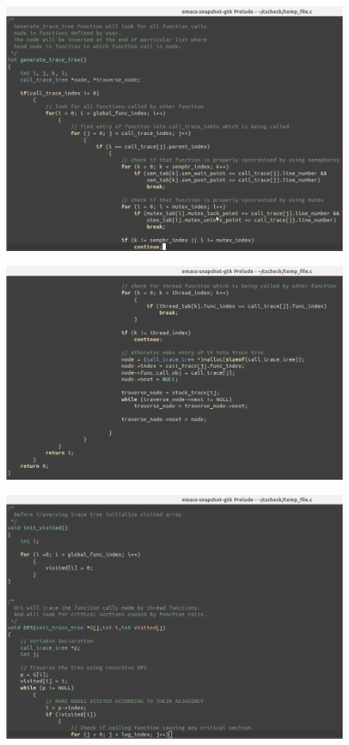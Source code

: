 \begin{figure}[H]
\centering
\includegraphics[scale=0.4]{Snaps/util_6.png}
\label{<<Label>>}
\end{figure}

\begin{figure}[H]
\centering
\includegraphics[scale=0.4]{Snaps/util_7.png}
\label{<<Label>>}
\end{figure}

\begin{figure}[H]
\centering
\includegraphics[scale=0.4]{Snaps/util_8.png}
\label{<<Label>>}
\end{figure}

